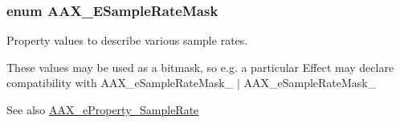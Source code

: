 \subsubsection[{A\+A\+X\+\_\+\+E\+Sample\+Rate\+Mask}]{\setlength{\rightskip}{0pt plus 5cm}enum {\bf A\+A\+X\+\_\+\+E\+Sample\+Rate\+Mask}}\label{a00206_a5bb98259de21d2c4d04a2d6010d757c7}


Property values to describe various sample rates. 

These values may be used as a bitmask, so e.\+g. a particular Effect may declare compatibility with {\ttfamily A\+A\+X\+\_\+e\+Sample\+Rate\+Mask\+\_ $\vert$ A\+A\+X\+\_\+e\+Sample\+Rate\+Mask\+\_}

\begin{DoxySeeAlso}{See also}
\hyperlink{a00283_a6571f4e41a5dd06e4067249228e2249eac5294e2feb18587d57b6ca0216a6bb1e}{A\+A\+X\+\_\+e\+Property\+\_\+\+Sample\+Rate} 
\end{DoxySeeAlso}
